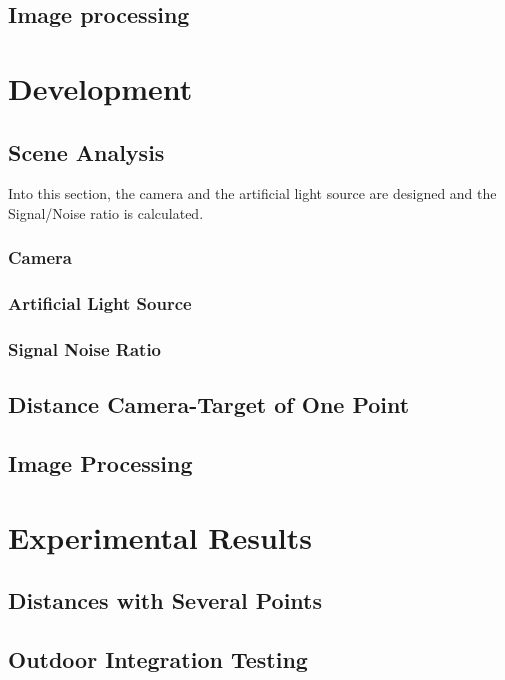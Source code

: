 \documentclass[12pt,a4paper,fleqn, onesside]{report}
\begin{document}
\section{Image processing}


\chapter{Development}
\section{Scene Analysis}
Into this section, the camera and the artificial light source are designed and the Signal/Noise ratio is calculated.
\subsection{Camera}

\subsection{Artificial Light Source}

\subsection{Signal Noise Ratio}


\section{Distance Camera-Target of One Point}

\section{Image Processing}



\chapter{Experimental Results}

\section{Distances with Several Points}

\section{Outdoor Integration Testing}



\end{document}
